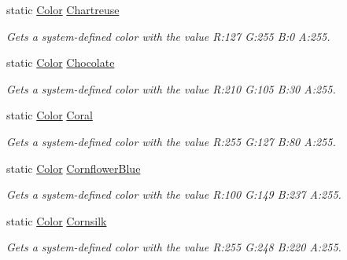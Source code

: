 \begin{DoxyCompactItemize}
static \hyperlink{struct_microsoft_1_1_xna_1_1_framework_1_1_color}{Color} \hyperlink{struct_microsoft_1_1_xna_1_1_framework_1_1_color_a24b41ac95f851a90b1d745219274149b}{Chartreuse}
\begin{DoxyCompactList}\small\item\em Gets a system-\/defined color with the value R\+:127 G\+:255 B\+:0 A\+:255.\end{DoxyCompactList}\item 
static \hyperlink{struct_microsoft_1_1_xna_1_1_framework_1_1_color}{Color} \hyperlink{struct_microsoft_1_1_xna_1_1_framework_1_1_color_afc7f3e03a47c295eaf09374f401fb492}{Chocolate}
\begin{DoxyCompactList}\small\item\em Gets a system-\/defined color with the value R\+:210 G\+:105 B\+:30 A\+:255.\end{DoxyCompactList}\item 
static \hyperlink{struct_microsoft_1_1_xna_1_1_framework_1_1_color}{Color} \hyperlink{struct_microsoft_1_1_xna_1_1_framework_1_1_color_ad2f22969e0efeaa9b721c0c024872d81}{Coral}
\begin{DoxyCompactList}\small\item\em Gets a system-\/defined color with the value R\+:255 G\+:127 B\+:80 A\+:255.\end{DoxyCompactList}\item 
static \hyperlink{struct_microsoft_1_1_xna_1_1_framework_1_1_color}{Color} \hyperlink{struct_microsoft_1_1_xna_1_1_framework_1_1_color_a134fcc7aee6e6113b65e498e25d5c504}{Cornflower\+Blue}
\begin{DoxyCompactList}\small\item\em Gets a system-\/defined color with the value R\+:100 G\+:149 B\+:237 A\+:255.\end{DoxyCompactList}\item 
static \hyperlink{struct_microsoft_1_1_xna_1_1_framework_1_1_color}{Color} \hyperlink{struct_microsoft_1_1_xna_1_1_framework_1_1_color_a75e2587c0c1136424490341cf5bbff96}{Cornsilk}
\begin{DoxyCompactList}\small\item\em Gets a system-\/defined color with the value R\+:255 G\+:248 B\+:220 A\+:255.\end{DoxyCompactList}\item 

\end{DoxyCompactItemize}
